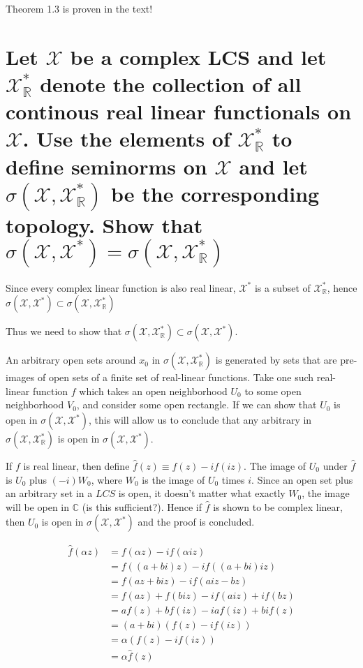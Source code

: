 \documentclass{article}
\begin{document}
Theorem 1.3 is proven in the text!

\section{Let $\mathscr{X}$ be a complex LCS and let $\mathscr{X}^*_{\mathbb{R}}$ denote the collection of all continous real linear functionals on $\mathscr{X}$. Use the elements of $\mathscr{X}^*_{\mathbb{R}}$  to define seminorms on $\mathscr{X}$ and let $\sigma(\mathscr{X}, \mathscr{X}^*_{\mathbb{R}})$ be the corresponding topology. Show that $\sigma(\mathscr{X}, \mathscr{X}^*) = \sigma(\mathscr{X}, \mathscr{X}^*_{\mathbb{R}})$}

Since every complex linear function is also real linear, $\mathscr{X}^*$ is a subset of $\mathscr{X}^*_{\mathbb{R}}$,  hence  $\sigma(\mathscr{X}, \mathscr{X}^*) \subset \sigma(\mathscr{X}, \mathscr{X}^*_{\mathbb{R}})$ 

Thus we need to show that $\sigma(\mathscr{X}, \mathscr{X}^*_{\mathbb{R}}) \subset \sigma(\mathscr{X}, \mathscr{X}^*)$.

An arbitrary open sets around $x_0$ in $\sigma(\mathscr{X}, \mathscr{X}^*_{\mathbb{R}})$ is generated by sets that are pre-images of open sets of a finite set of real-linear functions. Take one such real-linear function $f$ which takes an open neighborhood $U_0$ to some open neighborhood $V_0$, and consider some open rectangle. If we can show that $U_0$ is open in $\sigma(\mathscr{X}, \mathscr{X}^*)$, this will allow us to conclude that any arbitrary in $\sigma(\mathscr{X}, \mathscr{X}^*_{\mathbb{R}})$ is open in $\sigma(\mathscr{X}, \mathscr{X}^*)$.

If $f$ is real linear, then define $\hat{f}(z) \equiv f(z) - i f(iz)$. The image of $U_0$ under $\hat{f}$ is $U_0$ plus $ (-i) W_0$, where $W_0$ is the image of $U_0$ times $i$. Since an open set plus an arbitrary set in a $LCS$ is open, it doesn't matter what exactly $W_0$, the image will be open in $\mathbb{C}$ (is this sufficient?). Hence if $\hat{f}$ is shown to be complex linear, then $U_0$ is open in $\sigma(\mathscr{X}, \mathscr{X}^*)$ and the proof is concluded. 

\begin{align}
\hat{f}( \alpha z) &= f(\alpha z) - i f (\alpha i z) \\
&= f( (a+bi) z) - i f((a+bi) i z) \\
&= f(az + biz) - i f(aiz - bz) \\
&= f(az) + f(biz) - if(aiz) + if(bz) \\
&= af(z) + bf(iz) - iaf(iz) + bif(z) \\
&= (a+bi) (f(z) - i f(iz)) \\
&= \alpha (f(z) - i f(iz)) \\
&= \alpha \hat{f}(z)
\end{align}
\end{document}
